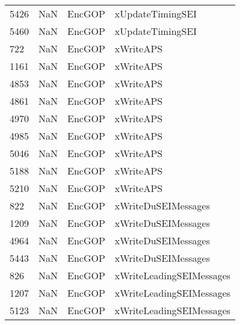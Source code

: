 \begin{tabular}{llll}
5426 &                   NaN &                     EncGOP &                          xUpdateTimingSEI \\
5460 &                   NaN &                     EncGOP &                          xUpdateTimingSEI \\
722  &                   NaN &                     EncGOP &                                 xWriteAPS \\
1161 &                   NaN &                     EncGOP &                                 xWriteAPS \\
4853 &                   NaN &                     EncGOP &                                 xWriteAPS \\
4861 &                   NaN &                     EncGOP &                                 xWriteAPS \\
4970 &                   NaN &                     EncGOP &                                 xWriteAPS \\
4985 &                   NaN &                     EncGOP &                                 xWriteAPS \\
5046 &                   NaN &                     EncGOP &                                 xWriteAPS \\
5188 &                   NaN &                     EncGOP &                                 xWriteAPS \\
5210 &                   NaN &                     EncGOP &                                 xWriteAPS \\
822  &                   NaN &                     EncGOP &                       xWriteDuSEIMessages \\
1209 &                   NaN &                     EncGOP &                       xWriteDuSEIMessages \\
4964 &                   NaN &                     EncGOP &                       xWriteDuSEIMessages \\
5443 &                   NaN &                     EncGOP &                       xWriteDuSEIMessages \\
826  &                   NaN &                     EncGOP &                  xWriteLeadingSEIMessages \\
1207 &                   NaN &                     EncGOP &                  xWriteLeadingSEIMessages \\
5123 &                   NaN &                     EncGOP &                  xWriteLeadingSEIMessages \\

\end{tabular}
